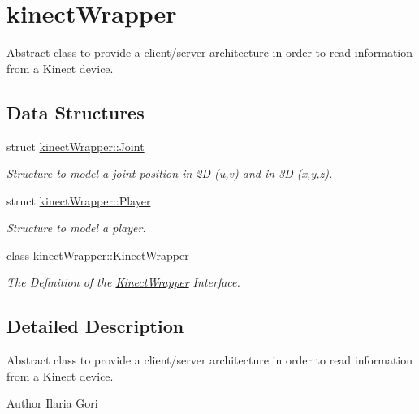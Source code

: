 \section{kinect\+Wrapper}
\label{group__kinectWrapper}


Abstract class to provide a client/server architecture in order to read information from a Kinect device.  


\subsection*{Data Structures}
\begin{DoxyCompactItemize}
\item 
struct \hyperlink{structkinectWrapper_1_1Joint}{kinect\+Wrapper\+::\+Joint}
\begin{DoxyCompactList}\small\item\em Structure to model a joint position in 2D (u,v) and in 3D (x,y,z). \end{DoxyCompactList}\item 
struct \hyperlink{structkinectWrapper_1_1Player}{kinect\+Wrapper\+::\+Player}
\begin{DoxyCompactList}\small\item\em Structure to model a player. \end{DoxyCompactList}\item 
class \hyperlink{classkinectWrapper_1_1KinectWrapper}{kinect\+Wrapper\+::\+Kinect\+Wrapper}
\begin{DoxyCompactList}\small\item\em The Definition of the \hyperlink{classkinectWrapper_1_1KinectWrapper}{Kinect\+Wrapper} Interface. \end{DoxyCompactList}\end{DoxyCompactItemize}


\subsection{Detailed Description}
Abstract class to provide a client/server architecture in order to read information from a Kinect device. 

\begin{DoxyAuthor}{Author}
Ilaria Gori 
\end{DoxyAuthor}
